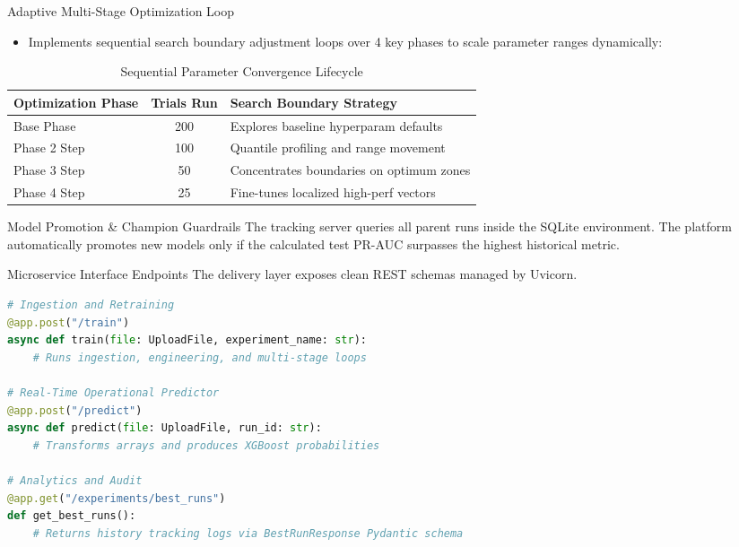 \begin{frame}{Adaptive Multi-Stage Optimization Loop}
    \begin{itemize}
        \item Implements sequential search boundary adjustment loops over 4 key phases to scale parameter ranges dynamically:
    \end{itemize}
    \begin{table}\scriptsize
        \centering
        \begin{tabular}{lcl}
            \toprule
            \textbf{Optimization Phase} & \textbf{Trials Run} & \textbf{Search Boundary Strategy} \\
            \midrule
            Base Phase & 200 & Explores baseline hyperparam defaults \\
            Phase 2 Step & 100 & Quantile profiling and range movement \\
            Phase 3 Step & 50 & Concentrates boundaries on optimum zones \\
            Phase 4 Step & 25 & Fine-tunes localized high-perf vectors \\
            \bottomrule
        \end{tabular}
        \caption{Sequential Parameter Convergence Lifecycle}
    \end{table}
    \begin{block}{Model Promotion \& Champion Guardrails}
        The tracking server queries all parent runs inside the SQLite environment. The platform automatically promotes new models only if the calculated test PR-AUC surpasses the highest historical metric.
    \end{block}
\end{frame}

\begin{frame}[fragile]{Microservice Interface Endpoints}
    The delivery layer exposes clean REST schemas managed by Uvicorn.
    \begin{lstlisting}[language=Python]
# Ingestion and Retraining 
@app.post("/train")
async def train(file: UploadFile, experiment_name: str):
    # Runs ingestion, engineering, and multi-stage loops

# Real-Time Operational Predictor
@app.post("/predict")
async def predict(file: UploadFile, run_id: str):
    # Transforms arrays and produces XGBoost probabilities

# Analytics and Audit
@app.get("/experiments/best_runs")
def get_best_runs():
    # Returns history tracking logs via BestRunResponse Pydantic schema
    \end{lstlisting}
\end{frame}

